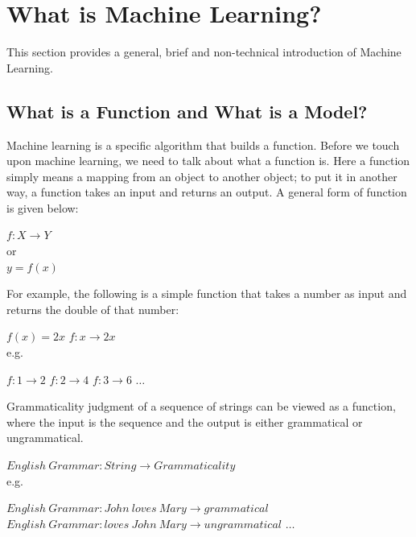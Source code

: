 \documentclass[final]{ua-thesis}
\numberwithin{equation}{section}
\begin{document}
\section{What is Machine Learning?}

This section provides a general, brief and non-technical introduction of Machine Learning.

\subsection{What is a Function and What is a Model?}
Machine learning is a specific algorithm that builds a function. Before we touch upon machine learning, we need to talk about what a function is. Here a function simply means a mapping from an object to another object; to put it in another way, a function takes an input and returns an output. A general form of function is given below:

\begin{exe}
\ex $f: X \rightarrow Y$\\
	or \\
	$ y=f(x) $
\end{exe} 


For example, the following is a simple function that takes a number as input and returns the double of that number:

\begin{exe}
\ex \label{math_function}
\begin{xlist}
\ex $f(x)=2x$
\ex $f: x \rightarrow 2x $\\
	e.g.
	\begin{xlist}
	\ex $f: 1 \rightarrow 2$
	\ex $f: 2 \rightarrow 4$
	\ex $f: 3 \rightarrow 6$
	\ex $\dots$
	\end{xlist}
\end{xlist}
\end{exe}

Grammaticality judgment of a sequence of strings can be viewed as a function, where the input is the sequence and the output is either grammatical or ungrammatical.  

\begin{exe}
\ex 
\begin{xlist}
\ex $English\ Grammar: String \rightarrow Grammaticality$\\
	e.g.
	\begin{xlist}
	\ex $English\ Grammar:  John\ loves\ Mary \rightarrow grammatical $
	\ex $English\ Grammar: loves\ John\ Mary \rightarrow ungrammatical $
	\ex $\dots$
	\end{xlist}
\end{xlist}
\end{exe}
\end{document}
